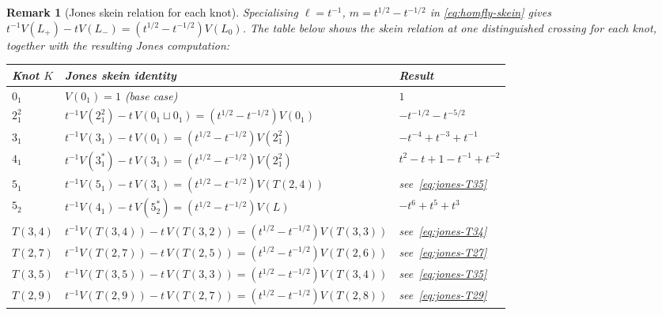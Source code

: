 \documentclass[12pt,a4paper]{report}
\newtheorem{remark}[theorem]{Remark}
\providecommand{\DIFaddtex}[1]{{\protect\color{DIFgreen} \sf #1}} %
\providecommand{\DIFadd}[1]{\texorpdfstring{\DIFaddtex{#1}}{#1}} %
\begin{document}
\begin{remark}[Jones skein relation for each knot]
\DIFadd{\label{rem:jones-skein-per-knot}
Specialising $\ell = t^{-1}$, $m = t^{1/2}-t^{-1/2}$ in
\eqref{eq:homfly-skein} gives
$t^{-1}V(L_+) - tV(L_-) = (t^{1/2}-t^{-1/2})V(L_0)$.
The table below shows the skein relation at one distinguished crossing
for each knot, together with the resulting Jones computation:
}

\medskip
{\renewcommand{\arraystretch}{1.4}
\noindent\begin{tabular}{lll}
\hline
\DIFadd{\textbf{Knot $K$} }& \DIFadd{\textbf{Jones skein identity} }& \DIFadd{\textbf{Result} }\\
\hline
\DIFadd{$0_1$
  }& \DIFadd{$V(0_1) = 1$ (base case)
  }& \DIFadd{$1$ }\\[2pt]
\DIFadd{$2^2_1$
  }& \DIFadd{$t^{-1}V(2^2_1) - t\,V(0_1\sqcup 0_1) = (t^{1/2}-t^{-1/2})V(0_1)$
  }& \DIFadd{$-t^{-1/2}-t^{-5/2}$ }\\[2pt]
\DIFadd{$3_1$
  }& \DIFadd{$t^{-1}V(3_1) - t\,V(0_1) = (t^{1/2}-t^{-1/2})V(2^2_1)$
  }& \DIFadd{$-t^{-4}+t^{-3}+t^{-1}$ }\\[2pt]
\DIFadd{$4_1$
  }& \DIFadd{$t^{-1}V(3_1^*) - t\,V(3_1) = (t^{1/2}-t^{-1/2})V(2^2_1)$
  }& \DIFadd{$t^2-t+1-t^{-1}+t^{-2}$ }\\[2pt]
\DIFadd{$5_1$
  }& \DIFadd{$t^{-1}V(5_1)-t\,V(3_1)=(t^{1/2}-t^{-1/2})V(T(2,4))$
  }& \DIFadd{see~\eqref{eq:jones-T35} }\\[2pt]
\DIFadd{$5_2$
  }& \DIFadd{$t^{-1}V(4_1)-t\,V(5_2^*)=(t^{1/2}-t^{-1/2})V(L)$
  }& \DIFadd{$-t^6+t^5+t^3$ }\\[2pt]
\DIFadd{$T(3,4)$
  }& \DIFadd{$t^{-1}V(T(3,4))-t\,V(T(3,2))=(t^{1/2}-t^{-1/2})V(T(3,3))$
  }& \DIFadd{see~\eqref{eq:jones-T34} }\\[2pt]
\DIFadd{$T(2,7)$
  }& \DIFadd{$t^{-1}V(T(2,7))-t\,V(T(2,5))=(t^{1/2}-t^{-1/2})V(T(2,6))$
  }& \DIFadd{see~\eqref{eq:jones-T27} }\\[2pt]
\DIFadd{$T(3,5)$
  }& \DIFadd{$t^{-1}V(T(3,5))-t\,V(T(3,3))=(t^{1/2}-t^{-1/2})V(T(3,4))$
  }& \DIFadd{see~\eqref{eq:jones-T35} }\\[2pt]
\DIFadd{$T(2,9)$
  }& \DIFadd{$t^{-1}V(T(2,9))-t\,V(T(2,7))=(t^{1/2}-t^{-1/2})V(T(2,8))$
  }& \DIFadd{see~\eqref{eq:jones-T29} }\\[2pt]
\hline
\end{tabular}}
\end{remark}
\end{document}
